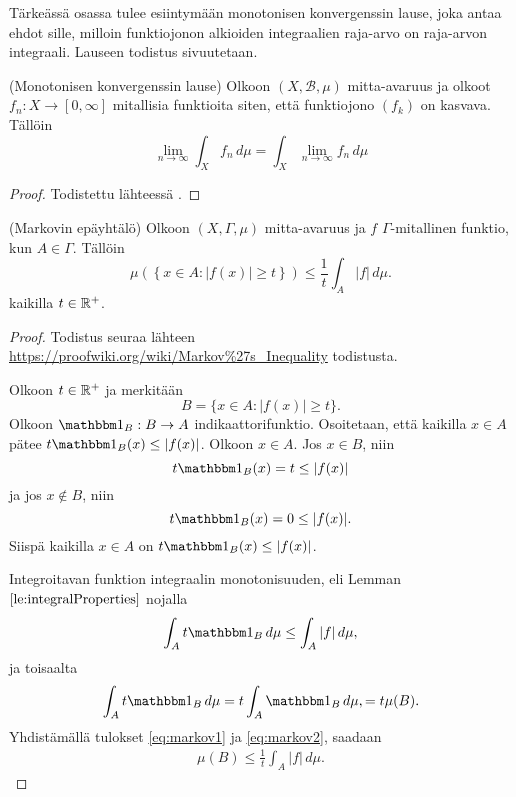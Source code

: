\documentclass[12pt,oneside,a4paper]{amsbook} %
\begin{document}
Tärkeässä osassa tulee esiintymään monotonisen konvergenssin lause, joka antaa ehdot sille, milloin funktiojonon alkioiden integraalien raja-arvo on raja-arvon integraali. Lauseen todistus sivuutetaan.
\begin{theorem} \label{thm:monoConvThm}
    (Monotonisen konvergenssin lause) Olkoon $(X, \mathcal{B}, \mu)$ mitta-avaruus ja olkoot $f_n:X\to [0, \infty]$ mitallisia funktioita siten, että funktiojono $(f_k)$ on kasvava. Tällöin
    \begin{equation*}
        \lim_{n\to\infty} \int_X f_n \, d\mu = \int_X \lim_{n\to \infty} f_n \, d\mu
    \end{equation*}
\end{theorem}
\begin{proof}
    Todistettu lähteessä \cite[s. 107]{tao}.
\end{proof}


\begin{theorem}\label{thm:markov}
    (Markovin epäyhtälö) Olkoon $(X, \Gamma, \mu)$ mitta-avaruus ja $f$ $\Gamma$-mitallinen funktio, kun $A \in \Gamma$. Tällöin
    \begin{equation*}
        \mu(\left\{x \in A : |f(x)| \ge t\right\}) \le \frac{1}{t}\int_A |f| \, d\mu.
    \end{equation*}
    kaikilla $t\in {\mathbb{R}^{+}}$.
\end{theorem}
\begin{proof}
    Todistus seuraa lähteen \url{https://proofwiki.org/wiki/Markov%27s_Inequality} todistusta. 
    
    Olkoon $t \in {\mathbb{R}^{+}}$ ja merkitään
    \begin{equation*}
        B = \{x \in A : |f(x)| \ge t\}.
    \end{equation*}
    Olkoon $\indfct{B}: B \to A$ indikaattorifunktio. Osoitetaan, että kaikilla $x\in A$ pätee $t\indfct{B}(x) \le |f(x)|$. Olkoon $x \in A$. Jos $x \in B$, niin 
    \begin{equation*}
        t\indfct B (x) = t \le |f(x)|
    \end{equation*}
    ja jos $x \notin B$, niin
    \begin{equation*}
        t\indfct B (x) = 0 \le |f(x)|.
    \end{equation*}
    Siispä kaikilla $x\in A$ on $t\indfct{B}(x) \le |f(x)|$.
    
    Integroitavan funktion integraalin monotonisuuden, eli Lemman $\ref{le:integralProperties}$ nojalla
    \begin{equation}\label{eq:markov1}
        \int_A t\indfct{B} \, d\mu \le \int_A |f| \, d\mu,
    \end{equation}
    ja toisaalta
    \begin{equation}\label{eq:markov2}
        \int_A t\indfct{B} \, d\mu = t\int_A \indfct{B} \, d\mu, = t\mu(B).
    \end{equation}
    Yhdistämällä tulokset \eqref{eq:markov1} ja \eqref{eq:markov2}, saadaan
    \begin{align*}
        \mu(B) \le \frac{1}{t}\int_A |f| \, d\mu.
    \end{align*}
    
\end{proof}
\end{document}
